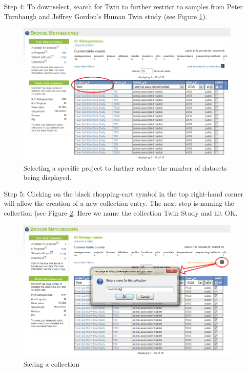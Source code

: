 \documentclass[12pt,fullpage]{report}
\begin{document}
Step 4: To downselect, search for Twin to further restrict to samples from Peter Turnbaugh and Jeffrey Gordon's Human Twin study (see Figure \ref{fig:collections-twin}).

\begin{figure}[ht]
\begin{center}
\includegraphics[width=6in]{Images/collections-twin.png}
\end{center}
\caption{
Selecting a specific project to further reduce the number of datasets being displayed. }
\label{fig:collections-twin}
\end{figure}

Step 5: Clicking on the black shopping-cart symbol in the top right-hand corner will allow the creation of a new collection entry. The next step is naming the collection (see Figure \ref{fig:Collections-how-to-save}.
Here we name the collection Twin Study and hit OK.

\begin{figure}[ht]
\begin{center}
\includegraphics[width=6in]{Images/Collections-how-to-save.png}
\end{center}
\caption{
Saving a collection}
\label{fig:Collections-how-to-save}
\end{figure}
\end{document}

